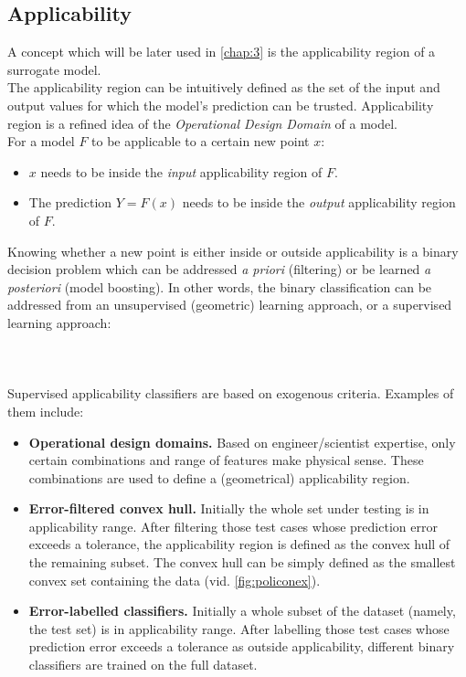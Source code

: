 \subsection{Applicability}
A concept which will be later used in \autoref{chap:3} is the applicability region of a surrogate model.\\
\indent The applicability region can be intuitively defined as the set of the input and output values for which the model's prediction can be trusted. Applicability region is a refined idea of the \textit{Operational Design Domain} of a model.\\
\indent For a model $F$ to be applicable to a certain new point $x$:
\begin{itemize}
	\item $x$ needs to be inside the \textit{input} applicability region of $F$.
	\item The prediction $Y=F(x)$ needs to be inside the \textit{output} applicability region of $F$.\\
\end{itemize}
%
\indent Knowing whether a new point is either inside or outside applicability is a binary decision problem which can be addressed \textit{a priori} (filtering) or be learned \textit{a posteriori} (model boosting). In other words, the binary classification can be addressed from an unsupervised (geometric) learning approach, or a supervised learning approach:
\paragraph{ \\}
Supervised applicability classifiers are based on exogenous criteria. Examples of them include:
\begin{itemize}
	\item \textbf{Operational design domains.} Based on engineer/scientist expertise, only certain combinations and range of features make physical sense. These combinations are used to define a (geometrical) applicability region.
	\item \textbf{Error-filtered convex hull.} Initially the whole set under testing is in applicability range. After filtering those test cases whose prediction error exceeds a tolerance, the applicability region is defined as the convex hull of the remaining subset. The convex hull can be simply defined as the smallest convex set containing the data\cite{Preparata1985} (vid. \cref{fig:policonex}).
	\item \textbf{Error-labelled classifiers.} Initially a whole subset of the dataset (namely, the test set) is in applicability range. After labelling those test cases whose prediction error exceeds a tolerance as outside applicability, different binary classifiers are trained on the full dataset.\\
\end{itemize}

